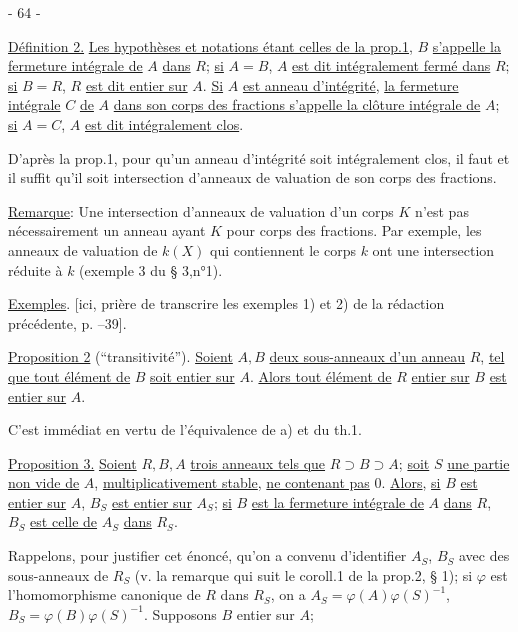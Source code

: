 \begin{center}- 64 -\end{center}

\uline{Définition 2.} \uline{Les hypothèses et notations étant celles de la prop.1}, $B$ \uline{s'appelle la fermeture intégrale de} $A$ \uline{dans} $R$; \uline{si} $A=B$, $A$ \uline{est dit intégralement fermé dans} $R$; \uline{si} $B=R$, $R$ \uline{est dit entier sur} $A$.
\uline{Si} $A$ \uline{est anneau d'intégrité}, \uline{la fermeture intégrale} $C$ \uline{de} $A$ \uline{dans son corps des fractions s'appelle la clôture intégrale de} $A$; \uline{si} $A=C$, $A$ \uline{est dit intégralement clos}.

D'après la prop.1, pour qu'un anneau d'intégrité soit intégralement clos, il faut et il suffit qu'il soit intersection d'anneaux de valuation de son corps des fractions.

\uline{Remarque}: Une intersection d'anneaux de valuation d'un corps $K$ n'est pas nécessairement un anneau ayant $K$ pour corps des fractions. Par exemple, les anneaux de valuation de $k(X)$ qui contiennent le corps $k$ ont une intersection réduite à $k$ (exemple 3 du § 3,n°1).

\uline{Exemples}. [ici, prière de transcrire les exemples 1) et 2) de la rédaction précédente, p. --39].

\uline{Proposition 2} (``transitivité''). \uline{Soient} $A,B$ \uline{deux sous-anneaux d'un anneau} $R$, \uline{tel que tout élément de} $B$ \uline{soit entier sur} $A$. \uline{Alors tout élément de} $R$ \uline{entier sur} $B$ \uline{est entier sur} $A$.

C'est immédiat en vertu de l'équivalence de a) et  du th.1.

\uline{Proposition 3.} \uline{Soient} $R,B,A$ \uline{trois anneaux tels que} $R\supset B\supset A$; \uline{soit} $S$ \uline{une partie non vide de} $A$, \uline{multiplicativement stable}, \uline{ne contenant pas} $0$. \uline{Alors}, \uline{si} $B$ \uline{est entier sur} $A$, $B_S$ \uline{est entier sur} $A_S$; \uline{si} $B$ \uline{est la fermeture intégrale de} $A$ \uline{dans} $R$, $B_S$ \uline{est celle de} $A_S$ \uline{dans} $R_S$.

Rappelons, pour justifier cet énoncé, qu'on a convenu d'identifier $A_S$, $B_S$ avec des sous-anneaux de $R_S$ (v. la remarque qui suit le coroll.1 de la prop.2, § 1); si $\varphi$ est l'homomorphisme canonique de $R$ dans $R_S$, on a $A_S=\varphi(A)\varphi(S)^{-1}$, $B_S=\varphi(B)\varphi(S)^{-1}$. Supposons $B$ entier sur $A$;
